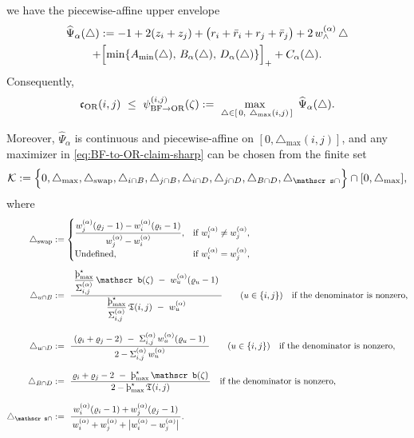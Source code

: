 \documentclass[twoside,11pt]{article}
\numberwithin{equation}{section}
\numberwithin{theorem}{section}
\numberwithin{example}{section}
\newcommand{\sho}{\textup{\text{\th}}}
\begin{document}
\begin{theorem}
\[\]
we have the piecewise-affine upper envelope
\begin{multline}
\label{eq:widehat-Psi}
\widehat\Psi_\alpha(\triangle)
:=
-1+2(z_i+z_j)
+\bigl(r_i+\bar r_i+r_j+\bar r_j\bigr)
+2\,w^{(\alpha)}_\wedge\,\triangle \\
+\Bigl[\min\{A_{\min}(\triangle),\,B_\alpha(\triangle),\,D_\alpha(\triangle)\}\Bigr]_+
+C_\alpha(\triangle).
\end{multline}
Consequently,
\begin{equation}
\label{eq:BF-to-OR-claim-sharp}
\mathfrak c_{\rm OR}(i,j)
\ \le\
\psi_{\rm BF\to OR}^{(i,j)}(\zeta)
:=\max_{\ \triangle\in[\,0,\ \triangle_{\max}(i,j)\,]}\ \widehat\Psi_\alpha(\triangle).
\end{equation}

\noindent
Moreover, $\widehat\Psi_\alpha$ is continuous and piecewise-affine on $[0,\triangle_{\max}(i,j)]$, and any maximizer in \eqref{eq:BF-to-OR-claim-sharp} can be chosen from the finite set
\begin{equation}
\label{eq:knot-set}
\mathcal K := \Bigl\{0, \triangle_{\max}, \triangle_{\rm swap}, \triangle_{i\cap B}, \triangle_{j\cap B}, \triangle_{i\cap D}, \triangle_{j\cap D}, \triangle_{B\cap D}, \triangle_{\mathscr s\cap}\Bigr\} \cap [0,\triangle_{\max}],
\end{equation}
where
\[
\begin{aligned}
\triangle_{\rm swap}&:=\begin{cases}
\displaystyle\frac{w^{(\alpha)}_j(\varrho_j-1)-w^{(\alpha)}_i(\varrho_i-1)}{\,w^{(\alpha)}_j-w^{(\alpha)}_i\,},&\text{if }w^{(\alpha)}_i\neq w^{(\alpha)}_j,\\[8pt]
\text{Undefined},&\text{if }w^{(\alpha)}_i= w^{(\alpha)}_j,
\end{cases}\\[6pt]
\triangle_{u\cap B}&:=\ \frac{\ \dfrac{\sho_{\max}^\star}{\Sigma^{(\alpha)}_{i,j}}\,\mathscr b(\zeta)\ -\ w^{(\alpha)}_u(\varrho_u-1)\ }{ \ \dfrac{\sho_{\max}^\star}{\Sigma^{(\alpha)}_{i,j}}\,\mathfrak T(i,j)\ -\ w^{(\alpha)}_u\ }\qquad(u\in\{i,j\})\quad\text{if the denominator is nonzero},\\[8pt]
\triangle_{u\cap D}&:=\ \frac{\ (\varrho_i+\varrho_j-2)\ -\ \Sigma^{(\alpha)}_{i,j}\,w^{(\alpha)}_u(\varrho_u-1)\ }{\,2-\Sigma^{(\alpha)}_{i,j}\,w^{(\alpha)}_u\,}\qquad(u\in\{i,j\})\quad\text{if the denominator is nonzero},\\[8pt]
\triangle_{B\cap D}&:=\ \frac{\,\varrho_i+\varrho_j-2\ -\ \sho_{\max}^\star\,\mathscr b(\zeta)\,}{\,2-\sho_{\max}^\star\,\mathfrak T(i,j)\,}\quad\text{if the denominator is nonzero},\\[8pt]
\triangle_{\mathscr s\cap}&:=\ \frac{\,w^{(\alpha)}_i(\varrho_i-1)+w^{(\alpha)}_j(\varrho_j-1)\,}{\,w^{(\alpha)}_i+w^{(\alpha)}_j+\bigl|w^{(\alpha)}_i-w^{(\alpha)}_j\bigr|\,}.
\end{aligned}
\]
\end{theorem}
\end{document}
